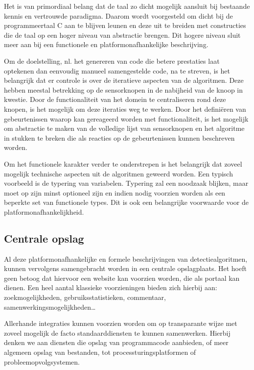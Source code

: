 Het is van primordiaal belang dat de taal zo dicht mogelijk aansluit bij
bestaande kennis en vertrouwde paradigma. Daarom wordt voorgesteld om dicht bij
de programmeertaal C aan te blijven leunen en deze uit te breiden met
constructies die de taal op een hoger niveau van abstractie brengen. Dit hogere
niveau sluit meer aan bij een functionele en platformonafhankelijke
beschrijving.

Om de doelstelling, nl. het genereren van code die betere prestaties laat
optekenen dan eenvoudig manueel samengestelde code, na te streven, is het
belangrijk dat er controle is over de iteratieve aspecten van de algoritmen.
Deze hebben meestal betrekking op de sensorknopen in de nabijheid van de knoop
in kwestie. Door de functionaliteit van het domein te centraliseren rond deze
knopen, is het mogelijk om deze iteraties weg te werken. Door het defini\"eren
van gebeurtenissen waarop kan gereageerd worden met functionaliteit, is het
mogelijk om abstractie te maken van de volledige lijst van sensorknopen en het
algoritme in stukken te breken die als reacties op de gebeurtenissen kunnen
beschreven worden.

Om het functionele karakter verder te onderstrepen is het belangrijk dat zoveel
mogelijk technische aspecten uit de algoritmen geweerd worden. Een typisch
voorbeeld is de typering van variabelen. Typering zal een noodzaak blijken,
maar moet op zijn minst optioneel zijn en indien nodig voorzien worden als een
beperkte set van functionele types. Dit is ook een belangrijke voorwaarde voor
de platformonafhankelijkheid.

\subsection{Centrale opslag}
\label{subsection:arch-repository}

Al deze platformonafhankelijke en formele beschrijvingen van
detectiealgoritmen, kunnen vervolgens samengebracht worden in een centrale
opslagplaats. Het hoeft geen betoog dat hiervoor een website kan voorzien
worden, die als portaal kan dienen. Een heel aantal klassieke voorzieningen
bieden zich hierbij aan: zoekmogelijkheden, gebruiksstatistieken, commentaar,
samenwerkingsmogelijkheden\dots

Allerhande integraties kunnen voorzien worden om op transparante wijze met
zoveel mogelijk de facto standaarddiensten te kunnen samenwerken. Hierbij
denken we aan diensten die opslag van programmacode aanbieden, of meer algemeen
opslag van bestanden, tot processturingsplatformen of probleemopvolgsystemen.

